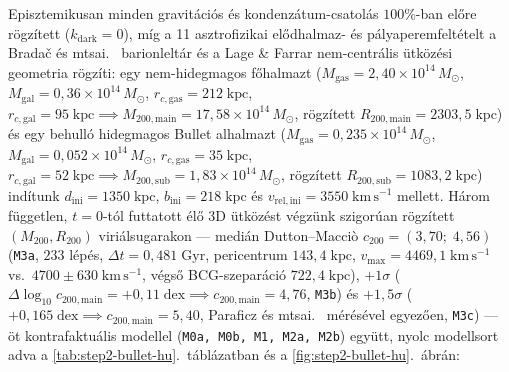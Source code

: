 \documentclass[11pt,a4paper]{article}
\begin{document}
Episztemikusan minden gravitációs és kondenzátum-csatolás $100\%$-ban előre rögzített ($k_{\mathrm{dark}} = 0$), míg a 11 asztrofizikai elődhalmaz- és pályaperemfeltételt a Brada\v{c} és mtsai.\ \cite{Bradac2006} barionleltár és a Lage \& Farrar \cite{LageFarrar2014} nem-centrális ütközési geometria rögzíti: egy nem-hidegmagos főhalmazt ($M_{\mathrm{gas}} = 2{,}40\times 10^{14}\,M_\odot$, $M_{\mathrm{gal}} = 0{,}36\times 10^{14}\,M_\odot$, $r_{c,\mathrm{gas}} = 212\;\mathrm{kpc}$, $r_{c,\mathrm{gal}} = 95\;\mathrm{kpc} \implies M_{200,\mathrm{main}} = 17{,}58\times 10^{14}\,M_\odot$, rögzített $R_{200,\mathrm{main}} = 2303{,}5\;\mathrm{kpc}$) és egy behulló hidegmagos Bullet alhalmazt ($M_{\mathrm{gas}} = 0{,}235\times 10^{14}\,M_\odot$, $M_{\mathrm{gal}} = 0{,}052\times 10^{14}\,M_\odot$, $r_{c,\mathrm{gas}} = 35\;\mathrm{kpc}$, $r_{c,\mathrm{gal}} = 52\;\mathrm{kpc} \implies M_{200,\mathrm{sub}} = 1{,}83\times 10^{14}\,M_\odot$, rögzített $R_{200,\mathrm{sub}} = 1083{,}2\;\mathrm{kpc}$) indítunk $d_{\mathrm{ini}} = 1350\;\mathrm{kpc}$, $b_{\mathrm{ini}} = 218\;\mathrm{kpc}$ és $v_{\mathrm{rel,ini}} = 3550\;\mathrm{km\,s^{-1}}$ mellett. Három független, $t = 0$-tól futtatott élő 3D ütközést végzünk szigorúan rögzített $(M_{200}, R_{200})$ viriálsugarakon --- medián Dutton--Macci\`o \cite{DuttonMaccio2014} $c_{200} = (3{,}70;\; 4{,}56)$ (\texttt{M3a}, $233$ lépés, $\Delta t = 0{,}481\;\mathrm{Gyr}$, pericentrum $143{,}4\;\mathrm{kpc}$, $v_{\max} = 4469{,}1\;\mathrm{km\,s^{-1}}$ vs.\ $4700 \pm 630\;\mathrm{km\,s^{-1}}$, végső BCG-szeparáció $722{,}4\;\mathrm{kpc}$), $+1\sigma$ ($\Delta\log_{10}c_{200,\mathrm{main}} = +0{,}11\;\mathrm{dex} \implies c_{200,\mathrm{main}} = 4{,}76$, \texttt{M3b}) és $+1{,}5\sigma$ ($+0{,}165\;\mathrm{dex} \implies c_{200,\mathrm{main}} = 5{,}40$, Paraficz és mtsai.\ \cite{Paraficz2016} mérésével egyezően, \texttt{M3c}) --- öt kontrafaktuális modellel (\texttt{M0a, M0b, M1, M2a, M2b}) együtt, nyolc modellsort adva a \ref{tab:step2-bullet-hu}.~táblázatban és a \ref{fig:step2-bullet-hu}.~ábrán:
\end{document}
